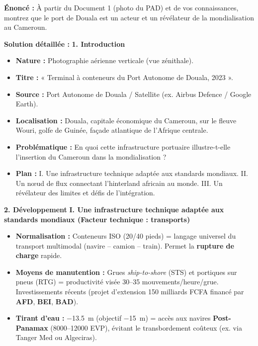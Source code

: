\documentclass[11pt]{article}
\begin{document}
\begin{exoresolu}
\textbf{Énoncé :} À partir du Document 1 (photo du PAD) et de vos connaissances, montrez que le port de Douala est un acteur et un révélateur de la mondialisation au Cameroun.

\textbf{Solution détaillée :}
\tcblower
\textbf{1. Introduction}
\begin{itemize}
    \item \textbf{Nature :} Photographie aérienne verticale (vue zénithale).
    \item \textbf{Titre :} « Terminal à conteneurs du Port Autonome de Douala, 2023 ».
    \item \textbf{Source :} Port Autonome de Douala / Satellite (ex. Airbus Defence / Google Earth).
    \item \textbf{Localisation :} Douala, capitale économique du Cameroun, sur le fleuve Wouri, golfe de Guinée, façade atlantique de l'Afrique centrale.
    \item \textbf{Problématique :} En quoi cette infrastructure portuaire illustre-t-elle l'insertion du Cameroun dans la mondialisation ?
    \item \textbf{Plan :} I. Une infrastructure technique adaptée aux standards mondiaux. II. Un nœud de flux connectant l'hinterland africain au monde. III. Un révélateur des limites et défis de l'intégration.
\end{itemize}

\textbf{2. Développement}
\textbf{I. Une infrastructure technique adaptée aux standards mondiaux (Facteur technique : transports)}
\begin{itemize}
    \item \textbf{Normalisation :} Conteneurs ISO (20/40 pieds) = langage universel du transport multimodal (navire – camion – train). Permet la \textbf{rupture de charge} rapide.
    \item \textbf{Moyens de manutention :} Grues \emph{ship-to-shore} (STS) et portiques sur pneus (RTG) = productivité visée \num{30}–\num{35} mouvements/heure/grue. Investissements récents (projet d'extension \num{150} milliards FCFA financé par \textbf{AFD}, \textbf{BEI}, \textbf{BAD}).
    \item \textbf{Tirant d'eau :} \SI{-13,5}{m} (objectif \SI{-15}{m}) = accès aux navires \textbf{Post-Panamax} (\num{8000}–\num{12000} EVP), évitant le transbordement coûteux (ex. via Tanger Med ou Algeciras).
\end{itemize}


\end{exoresolu}
\end{document}
